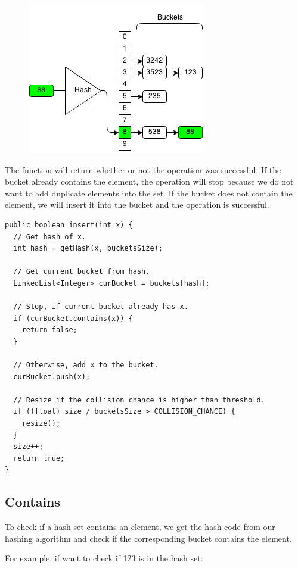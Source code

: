 \documentclass[11pt,oneside]{book}
\makeatletter
\def\maxwidth#1{\ifdim\Gin@nat@width>#1 #1\else\Gin@nat@width\fi}
\makeatother
\begin{document}
\vspace{5px}\begin{figure}[H]\centering
        \includegraphics[width=0.66\maxwidth{\textwidth}]{hashsetinsert.png}
        \end{figure}

The function will return whether or not the operation was successful. If the bucket already contains the element, the operation will stop because we do not want to add duplicate elements into the set. If the bucket does not contain the element, we will insert it into the bucket and the operation is successful.

\begin{lstlisting}
public boolean insert(int x) {
  // Get hash of x.
  int hash = getHash(x, bucketsSize);

  // Get current bucket from hash.
  LinkedList<Integer> curBucket = buckets[hash];
  
  // Stop, if current bucket already has x.
  if (curBucket.contains(x)) {
    return false;
  }
  
  // Otherwise, add x to the bucket.
  curBucket.push(x);
  
  // Resize if the collision chance is higher than threshold.
  if ((float) size / bucketsSize > COLLISION_CHANCE) {
    resize();
  }
  size++;
  return true;
}
\end{lstlisting}

\subsection{Contains}

To check if a hash set contains an element, we get the hash code from our hashing algorithm and check if the corresponding bucket contains the element.

For example, if want to check if 123 is in the hash set:
\end{document}
